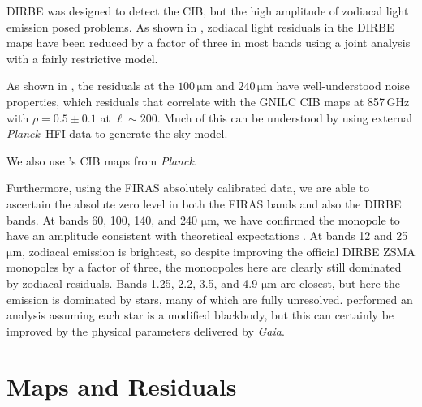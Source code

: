 \documentclass{aa}
\def\Planck{\textit{Planck}}
\begin{document}
DIRBE was designed to detect the CIB, but the high amplitude of zodiacal light emission posed problems. As shown in \citet{CG02_02}, zodiacal light residuals in the DIRBE maps have been reduced by a factor of three in most bands using a joint analysis with a fairly restrictive model.

As shown in \citet{CG02_01}, the residuals at the $100\,\mathrm{\mu m}$ and $240\,\mathrm{\mu m}$ have well-understood noise properties, which residuals that correlate with the GNILC \citet{planck2016-XLVIII} CIB maps at 857\,GHz with $\rho=0.5\pm0.1$ at $\ell\sim200$. Much of this can be understood by using external \Planck\ HFI data to generate the sky model. 

We also use \citet{lenz2019}'s CIB maps from \Planck.

Furthermore, using the FIRAS absolutely calibrated data, we are able to ascertain the absolute zero level in both the FIRAS bands and also the DIRBE bands. At bands 60, 100, 140, and 240 $\mathrm{\mu m}$, we have confirmed the monopole to have an amplitude consistent with theoretical expectations \citep{finke2022}. At bands 12 and 25 $\mathrm{\mu m}$, zodiacal emission is brightest, so despite improving the official DIRBE ZSMA monopoles by a factor of three, the monoopoles here are clearly still dominated by zodiacal residuals. Bands 1.25, 2.2, 3.5, and 4.9 $\mathrm{\mu m}$ are closest, but here the emission is dominated by stars, many of which are fully unresolved. \citet{CG02_01} performed an analysis assuming each star is a modified blackbody, but this can certainly be improved by the physical parameters delivered by \textit{Gaia}.


\section{Maps and Residuals}
\label{sec:maps_and_residuals}

\lipsum 
\end{document}
